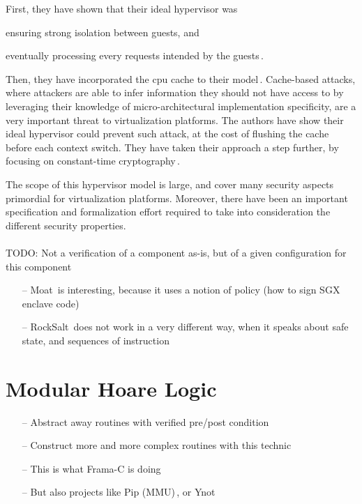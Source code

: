 First, they have shown that their ideal hypervisor was
%
\begin{inparaenum}[(1)]
\item ensuring strong isolation between guests, and
%
\item eventually processing every requests intended by the
  guests\,\cite{barthe2011virtcert1}.
\end{inparaenum}
%
Then, they have incorporated the \ac{cpu} cache to their
model\,\cite{barthe2012virtcert2}.
%
Cache-based attacks, where attackers are able to infer information they should
not have access to by leveraging their knowledge of micro-architectural
implementation specificity, are a very important threat to virtualization
platforms.
%
The authors have show their ideal hypervisor could prevent such attack, at the
cost of flushing the cache before each context switch.
%
They have taken their approach a step further, by focusing on constant-time
cryptography\,\cite{barthe2014virtcert3}.

The scope of this hypervisor model is large, and cover many security aspects
primordial for virtualization platforms.
%
Moreover, there have been an important specification and formalization effort
required to take into consideration the different security properties.

\paragraph{}
%
TODO: Not a verification of a component as-is, but of a given configuration for
this component

\begin{itemize}
\item[--] Moat\,\cite{sinha2015moat} is interesting, because it uses a notion of
  policy (how to sign SGX enclave code)
\item[--] RockSalt\,\cite{morrisett2012rocksalt} does not work in a very
  different way, when it speaks about safe state, and sequences of instruction
\end{itemize}

\section{Modular Hoare Logic} %

\begin{itemize}
\item[--] Abstract away routines with verified pre/post condition
\item[--] Construct more and more complex routines with this technic
\item[--] This is what Frama-C is doing
\item[--] But also projects like Pip (MMU)\,\cite{jomaa2016mmu}, or Ynot
\end{itemize}

